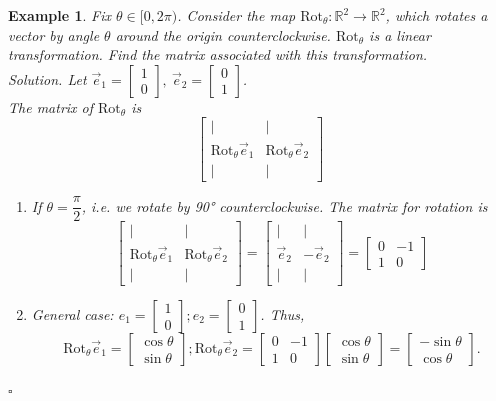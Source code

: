\documentclass[12pt, a4paper]{article}
\newtheorem{eg}{Example}[subsection]
\newenvironment*{sol}{\indent\textit{Solution. }}{\hfill{$\square$}\par}
\def\R{{\mathbb{R}}}
\def\vece{\vec{e}}
\begin{document}
\begin{eg}
Fix $\theta \in [0, 2\pi )$. Consider the map $\text{Rot}_\theta: \R^2 \rightarrow\R^2$, which rotates a vector by angle $\theta$ around the origin counterclockwise. $\text{Rot}_\theta$ is a linear transformation. Find the matrix associated with this transformation.\\
\begin{sol}
Let $\vece_1=\begin{bmatrix}1\\0\end{bmatrix},\ \vece_2=\begin{bmatrix}0\\1\end{bmatrix}$. \\
The matrix of $\text{Rot}_\theta$ is 
$$\begin{bmatrix}|&|\\ \text{Rot}_{\theta}\vece_1& \text{Rot}_{\theta}\vece_2\\|&|\end{bmatrix}$$
\begin{enumerate}
\item If $\theta = \dfrac{\pi}{2}$, i.e. we rotate by 90° counterclockwise. The matrix for rotation is $$\begin{bmatrix}|&|\\ \text{Rot}_{\theta}\vece_1& \text{Rot}_{\theta}\vece_2\\|&|\end{bmatrix}=\begin{bmatrix}|&|\\ \vece_2& -\vece_2\\|&|\end{bmatrix}=\begin{bmatrix}0&-1\\1&0\end{bmatrix}$$
\item General case: 
$e_1=\begin{bmatrix}1\\0\end{bmatrix};e_2=\begin{bmatrix}0\\1\end{bmatrix}$. Thus, $$\text{Rot}_{\theta}\vece_1=\begin{bmatrix}\cos{\theta}\\\sin{\theta}\end{bmatrix};\text{Rot}_{\theta}\vece_2=\begin{bmatrix}0&-1\\1&0\end{bmatrix}\begin{bmatrix}\cos{\theta}\\\sin{\theta}\end{bmatrix}=\begin{bmatrix}-\sin{\theta}\\\cos{\theta}\end{bmatrix}.$$

\end{enumerate}
\end{sol}
\end{eg}
\end{document}
